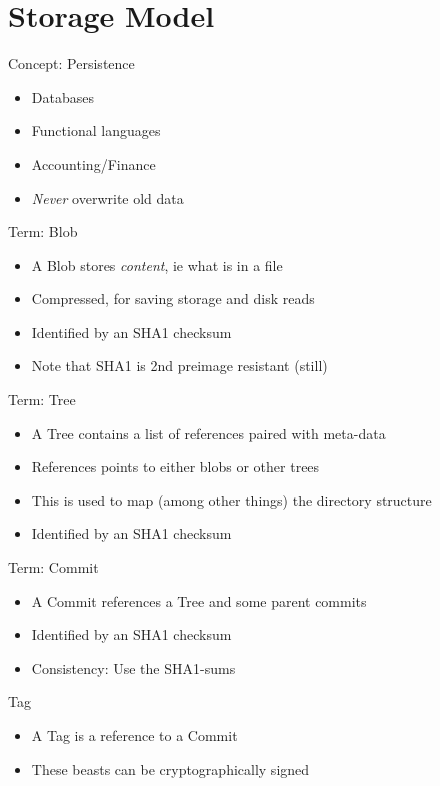 \documentclass[xcolor=pdftex,dvipsnames]{beamer}
\begin{document}
\section{Storage Model}
\begin{frame}{Concept: Persistence}
  \begin{itemize}
  \item Databases
  \item Functional languages
  \item Accounting/Finance
  \item \emph{Never} overwrite old data
  \end{itemize}
\end{frame}
\begin{frame}{Term: Blob}
  \begin{itemize}
  \item A Blob stores \emph{content}, ie what is in a file
  \item Compressed, for saving storage and disk reads
  \item Identified by an SHA1 checksum
  \item Note that SHA1 is 2nd preimage resistant (still)
  \end{itemize}
\end{frame}
\begin{frame}{Term: Tree}
  \begin{itemize}
  \item A Tree contains a list of references paired with meta-data
  \item References points to either blobs or other trees
  \item This is used to map (among other things) the directory
    structure
  \item Identified by an SHA1 checksum
  \end{itemize}
\end{frame}
\begin{frame}{Term: Commit}
  \begin{itemize}
  \item A Commit references a Tree and some parent commits
  \item Identified by an SHA1 checksum
  \item Consistency: Use the SHA1-sums
  \end{itemize}
\end{frame}
\begin{frame}{Tag}
  \begin{itemize}
  \item A Tag is a reference to a Commit
  \item These beasts can be cryptographically signed
  \end{itemize}
\end{frame}
\end{document}
